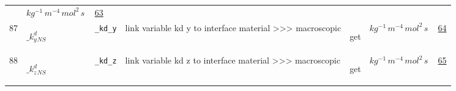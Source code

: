 \begin{longtable}{|p{1cm}|p{2.5cm}|p{4.5cm}|p{8cm}|p{3.0cm}|p{3cm}|p{1cm}|}
             & $ kg^{-1} \,m^{-4} \,mol^{2} \,s \, $
             &                 \hyperlink{"e:63"}{ 63 }
                 \\
            87
             & \hypertarget{"v:87"}{ $ {{\_k^d_y}}{_{{N S}}} $}
             & \verb|_kd_y|
             & link variable kd y to interface material >>> macroscopic
             & \begin{lay}get \end{lay}
             & $ kg^{-1} \,m^{-4} \,mol^{2} \,s \, $
             &                 \hyperlink{"e:64"}{ 64 }
                 \\
            88
             & \hypertarget{"v:88"}{ $ {{\_k^d_z}}{_{{N S}}} $}
             & \verb|_kd_z|
             & link variable kd z to interface material >>> macroscopic
             & \begin{lay}get \end{lay}
             & $ kg^{-1} \,m^{-4} \,mol^{2} \,s \, $
             &                 \hyperlink{"e:65"}{ 65 }
                 \\
    \end{longtable}